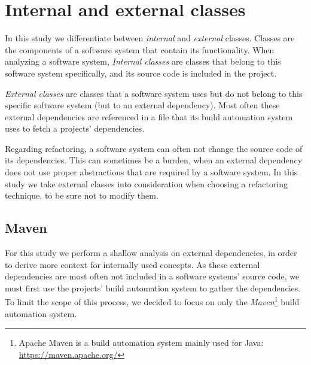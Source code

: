
\section{Internal and external classes}
In this study we differentiate between \textit{internal} and \textit{external} classes. Classes are the components of a software system that contain its functionality. When analyzing a software system, \textit{Internal classes} are classes that belong to this software system specifically, and its source code is included in the project.

\textit{External classes} are classes that a software system uses but do not belong to this specific software system (but to an external dependency). Most often these external dependencies are referenced in a file that its build automation system uses to fetch a projects' dependencies.

Regarding refactoring, a software system can often not change the source code of its dependencies. This can sometimes be a burden, when an external dependency does not use proper abstractions that are required by a software system. In this study we take external classes into consideration when choosing a refactoring technique, to be sure not to modify them.

\subsection{Maven}
For this study we perform a shallow analysis on external dependencies, in order to derive more context for internally used concepts. As these external dependencies are most often not included in a software systems' source code, we must first use the projects' build automation system to gather the dependencies. To limit the scope of this process, we decided to focus on only the \textit{Maven}\footnote{Apache Maven is a build automation system mainly used for Java: \url{https://maven.apache.org/}} build automation system.


